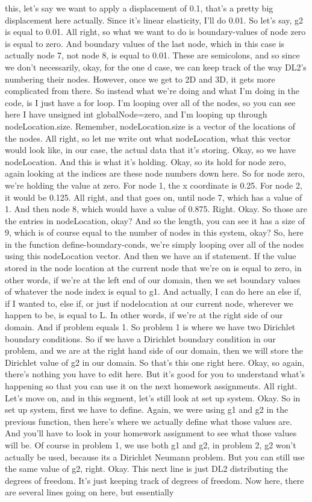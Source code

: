 \documentclass[10pt]{article}
\begin{document}
{this, let's say we want to apply a displacement of 0.1, that's a pretty big displacement here actually. Since it's linear elasticity, I'll do 0.01. So let's say, g2 is equal to 0.01. All right, so what we want to do is boundary-values of node zero is equal to zero. And boundary values of the last node, which in this case is actually node 7, not node 8, is equal to 0.01. These are semicolons, and so since we don't necessarily, okay, for the one d case, we can keep track of the way DL2's numbering their nodes. However, once we get to 2D and 3D, it gets more complicated from there. So instead what we're doing and what I'm doing in the code, is I just have a for loop. I'm looping over all of the nodes, so you can see here I have unsigned int globalNode=zero, and I'm looping up through nodeLocation.size. Remember, nodeLocation.size is a vector of the locations of the nodes. All right, so let me write out what nodeLocation, what this vector would look like, in our case, the actual data that it's storing. Okay, so we have nodeLocation. And this is what it's holding. Okay, so its hold for node zero, again looking at the indices are these node numbers down here. So for node zero, we're holding the value at zero. For node 1, the x coordinate is 0.25. For node 2, it would be 0.125. All right, and that goes on, until node 7, which has a value of 1. And then node 8, which would have a value of 0.875. Right. Okay. So those are the entries in nodeLocation, okay? And so the length, you can see it has a size of 9, which is of course equal to the number of nodes in this system, okay? So, here in the function define-boundary-conds, we're simply looping over all of the nodes using this nodeLocation vector. And then we have an if statement. If the value stored in the node location at the current node that we're on is equal to zero, in other words, if we're at the left end of our domain, then we set boundary values of whatever the node index is equal to g1. And actually, I can do here an else if, if I wanted to, else if, or just if nodelocation at our current node, wherever we happen to be, is equal to L. In other words, if we're at the right side of our domain. And if problem equals 1. So problem 1 is where we have two Dirichlet boundary conditions. So if we have a Dirichlet boundary condition in our problem, and we are at the right hand side of our domain, then we will store the Dirichlet value of g2 in our domain. So that's this one right here. Okay, so again, there's nothing you have to edit here. But it's good for you to understand what's happening so that you can use it on the next homework assignments. All right. Let's move on, and in this segment, let's still look at set up system. Okay. So in set up system, first we have to define. Again, we were using g1 and g2 in the previous function, then here's where we actually define what those values are. And you'll have to look in your homework assignment to see what those values will be. Of course in problem 1, we use both g1 and g2, in problem 2, g2 won't actually be used, because its a Dirichlet Neumann problem. But you can still use the same value of g2, right. Okay. This next line is just DL2 distributing the degrees of freedom. It's just keeping track of degrees of freedom. Now here, there are several lines going on here, but essentially }
\end{document}
